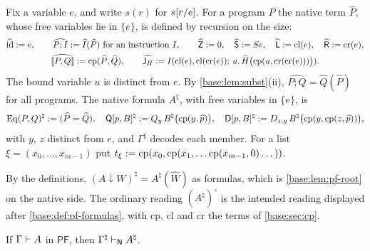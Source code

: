 \begin{definition}[Decoding]
\label{base:def:pf-decode}
Fix a variable $e$, and write $s(r)$ for $s[r/e]$.  For a program $P$
the native term $\widehat P$, whose free variables lie in $\{e\}$, is
defined by recursion on the size:
\begin{gather*}
 \widehat{\mathrm{id}}\mathrel{:=} e,\qquad
 \widehat{P;I}\mathrel{:=}\widehat I(\widehat P)\ \text{for an instruction }I,\qquad
 \widehat{\mathsf Z}\mathrel{:=} 0,\quad\widehat{\mathsf S}\mathrel{:=}S e,\quad
 \widehat{\mathsf L}\mathrel{:=}\mathrm{cl}(e),\quad\widehat{\mathsf R}\mathrel{:=}\mathrm{cr}(e),\\
 \widehat{[\![ P,Q]\!]}\mathrel{:=}\mathrm{cp}(\widehat P,\widehat Q),\qquad
 \widehat{\mathsf J_H}\mathrel{:=}
 I(\mathrm{cl}(e),\mathrm{cl}(\mathrm{cr}(e));\,u.\,\widehat H\bigl(\mathrm{cp}(u,\mathrm{cr}(\mathrm{cr}(e)))\bigr)).
\end{gather*}
The bound variable $u$ is distinct from $e$.  By \cref{base:lem:subst}(ii),
$\widehat{P;Q}=\widehat Q(\widehat P)$ for all programs.  The native formula $A^\natural$, with free variables in $\{e\}$,
is
\[
 \mathrm{Eq}(P,Q)^\natural\mathrel{:=}(\widehat P=\widehat Q),\quad
 \mathsf Q[p,B]^\natural\mathrel{:=}Q_{y}\,B^\natural\bigl(\mathrm{cp}(y,\widehat p)\bigr),\quad
 \mathsf D[p,B]^\natural\mathrel{:=}D_{z,y}\,B^\natural\bigl(\mathrm{cp}(y,\mathrm{cp}(z,\widehat p))\bigr),
\]
with $y$, $z$ distinct from $e$, and $\Gamma^\natural$ decodes each member.
For a list $\xi=(x_0,\dots,x_{m-1})$ put
$t_\xi\mathrel{:=}\mathrm{cp}(x_0,\mathrm{cp}(x_1,\dots\mathrm{cp}(x_{m-1},0)\dots))$.
\end{definition}

By the definitions, $(A{\downarrow}W)^\natural=A^\natural(\widehat W)$ as
formulas, which is \cref{base:lem:pf-root} on the native side.  The
ordinary reading $(A^\natural)^\circ$ is the intended reading displayed after
\cref{base:def:pf-formulas}, with $\mathrm{cp}$, $\mathrm{cl}$ and
$\mathrm{cr}$ the terms of \cref{base:sec:cp}.

\begin{proposition}
\label{base:prop:pf-sound}
If $\Gamma\vdash A$ in $\mathsf{PF}$, then
$\Gamma^\natural\vdash_{\mathsf{N}}A^\natural$.
\end{proposition}

